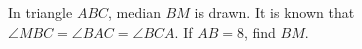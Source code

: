 In triangle $ABC$, median $BM$ is drawn. It is known that $\angle MBC=\angle BAC=\angle BCA$. If $AB=8$, find $BM$.
